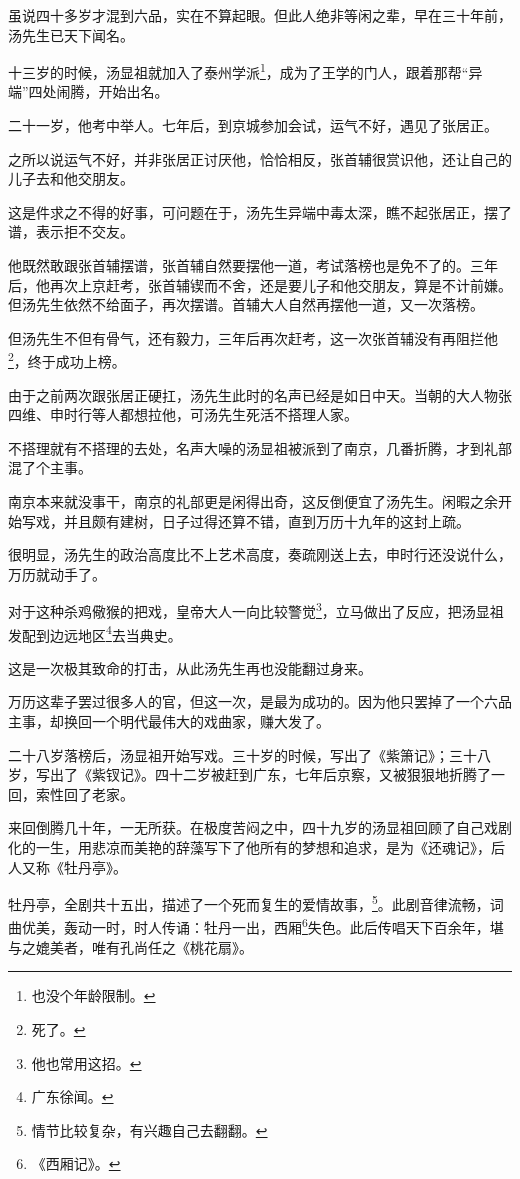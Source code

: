 \begin{multicols}{\theparacolNo}
虽说四十多岁才混到六品，实在不算起眼。但此人绝非等闲之辈，早在三十年前，汤先生已天下闻名。

十三岁的时候，汤显祖就加入了泰州学派\footnote{也没个年龄限制。}，成为了王学的门人，跟着那帮“异端”四处闹腾，开始出名。

二十一岁，他考中举人。七年后，到京城参加会试，运气不好，遇见了张居正。

之所以说运气不好，并非张居正讨厌他，恰恰相反，张首辅很赏识他，还让自己的儿子去和他交朋友。

这是件求之不得的好事，可问题在于，汤先生异端中毒太深，瞧不起张居正，摆了谱，表示拒不交友。

他既然敢跟张首辅摆谱，张首辅自然要摆他一道，考试落榜也是免不了的。三年后，他再次上京赶考，张首辅锲而不舍，还是要儿子和他交朋友，算是不计前嫌。但汤先生依然不给面子，再次摆谱。首辅大人自然再摆他一道，又一次落榜。

但汤先生不但有骨气，还有毅力，三年后再次赶考，这一次张首辅没有再阻拦他\footnote{死了。}，终于成功上榜。

由于之前两次跟张居正硬扛，汤先生此时的名声已经是如日中天。当朝的大人物张四维、申时行等人都想拉他，可汤先生死活不搭理人家。

不搭理就有不搭理的去处，名声大噪的汤显祖被派到了南京，几番折腾，才到礼部混了个主事。

南京本来就没事干，南京的礼部更是闲得出奇，这反倒便宜了汤先生。闲暇之余开始写戏，并且颇有建树，日子过得还算不错，直到万历十九年的这封上疏。

很明显，汤先生的政治高度比不上艺术高度，奏疏刚送上去，申时行还没说什么，万历就动手了。

对于这种杀鸡儆猴的把戏，皇帝大人一向比较警觉\footnote{他也常用这招。}，立马做出了反应，把汤显祖发配到边远地区\footnote{广东徐闻。}去当典史。

这是一次极其致命的打击，从此汤先生再也没能翻过身来。

万历这辈子罢过很多人的官，但这一次，是最为成功的。因为他只罢掉了一个六品主事，却换回一个明代最伟大的戏曲家，赚大发了。

二十八岁落榜后，汤显祖开始写戏。三十岁的时候，写出了《紫箫记》；三十八岁，写出了《紫钗记》。四十二岁被赶到广东，七年后京察，又被狠狠地折腾了一回，索性回了老家。

来回倒腾几十年，一无所获。在极度苦闷之中，四十九岁的汤显祖回顾了自己戏剧化的一生，用悲凉而美艳的辞藻写下了他所有的梦想和追求，是为《还魂记》，后人又称《牡丹亭》。

牡丹亭，全剧共十五出，描述了一个死而复生的爱情故事，\footnote{情节比较复杂，有兴趣自己去翻翻。}。此剧音律流畅，词曲优美，轰动一时，时人传诵：牡丹一出，西厢\footnote{《西厢记》。}失色。此后传唱天下百余年，堪与之媲美者，唯有孔尚任之《桃花扇》。


\end{multicols}
